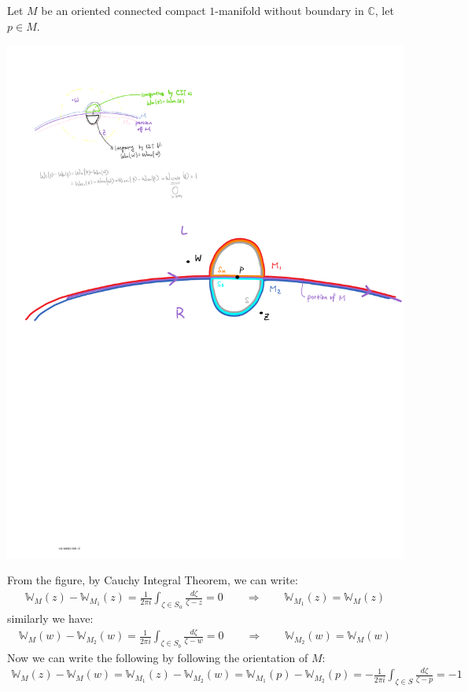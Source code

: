 \documentclass[15pt]{book}
\theoremstyle{break}
\theoremstyle{break}
\newcommand{\Complex}{\mathbb{C}}
\begin{document}
Let $M$ be an oriented connected compact $1$-manifold without boundary in $\Complex$, let $p \in M$. 
\begin{center}
\includegraphics[scale=0.65]{winding.pdf}
\end{center}

From the figure,  by Cauchy Integral Theorem, we can write:
\begin{align*}
\mathbb{W}_{M}(z)  - \mathbb{W}_{M_1}(z) = \frac{1}{2\pi i}\int_{\zeta \in S_{u}} \frac{d\zeta}{\zeta - z} = 0 \qquad \Rightarrow \qquad \mathbb{W}_{M_1}(z) = \mathbb{W}_{M}(z) 
\end{align*}
similarly we have:
\begin{align*}
\mathbb{W}_{M}(w) - \mathbb{W}_{M_2}(w)  = \frac{1}{2\pi i}\int_{\zeta \in S_{b}} \frac{d\zeta}{\zeta - w} = 0 \qquad \Rightarrow \qquad \mathbb{W}_{M_2}(w) = \mathbb{W}_{M}(w) 
\end{align*}
Now we can write the following by following the orientation of $M$:
\begin{align*}
\mathbb{W}_{M}(z) - \mathbb{W}_{M}(w) = \mathbb{W}_{M_1}(z) - \mathbb{W}_{M_2}(w) =
\mathbb{W}_{M_1}(p) - \mathbb{W}_{M_2}(p) = -\frac{1}{2\pi i}\int_{\zeta \in S}\frac{d\zeta}{\zeta - p} =  -1
\end{align*}
\end{document}
